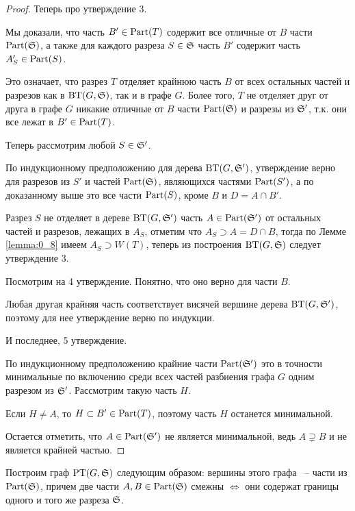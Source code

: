 \begin{proof}
	Теперь про утверждение 3.

	Мы доказали, что часть $B' \in \Part(T)$ содержит все отличные от $B$ части $\Part(\S)$, а также для каждого разреза $S \in \S$ часть $B'$ содержит часть $A'_S \in \Part(S)$.

	Это означает, что разрез $T$ отделяет крайнюю часть $B$ от всех остальных частей и разрезов как в $\BT(G, \S)$, так и в графе $G$. Более того, $T$ не отделяет друг от друга в графе $G$ никакие отличные от $B$ части $\Part(\S)$ и разрезы из $\S'$, т.к. они все лежат в $B' \in \Part(T)$.

	Теперь рассмотрим любой $S \in \S'$.

	 По индукционному предположению для дерева $\BT(G, \S')$, утверждение верно для разрезов из $S'$ и частей $\Part(\S)$, являющихся частями $\Part(S')$, а по доказанному выше это все части $\Part(S)$, кроме $B$ и $D = A \cap B'$.

	 Разрез $S$ не отделяет в дереве $\BT(G, \S')$ часть $A \in \Part(\S')$ от остальных частей и разрезов, лежащих в $A_S$, отметим что  $A_S \supset A = D \cap B$, тогда по Лемме \ref{lemma:0_8} имеем $A_S \supset W(T)$, теперь из построения $\BT(G, \S)$ следует утверждение 3.

	 Посмотрим на 4 утверждение. Понятно, что оно верно для части $B$.

	 Любая другая крайняя часть соответствует висячей вершине дерева $\BT(G, \S')$, поэтому для нее утверждение верно по индукции.

	 И последнее, 5 утверждение.

	 По индукционному предположению крайние части  $\Part(\S')$ это в точности минимальные по включению среди всех частей разбиения графа $G$ одним разрезом из $\S' $. Рассмотрим такую часть $H$.

	 Если $H \neq A$, то $H \subset B' \in \Part(T)$, поэтому часть $H$ останется минимальной.

	 Остается отметить, что $A \in \Part(\S')$ не является минимальной, ведь $A \supsetneq B$ и не является крайней частью.

\end{proof}

\begin{df*}[$\PT(G, \S)$]
	Построим граф $\PT(G, \S)$ следующим образом: вершины этого графа ~-- части из $\Part(\S)$, причем две части $A, B \in \Part(\S)$ смежны $\iff$ они содержат границы одного и того же разреза $\S$.
\end{df*}


